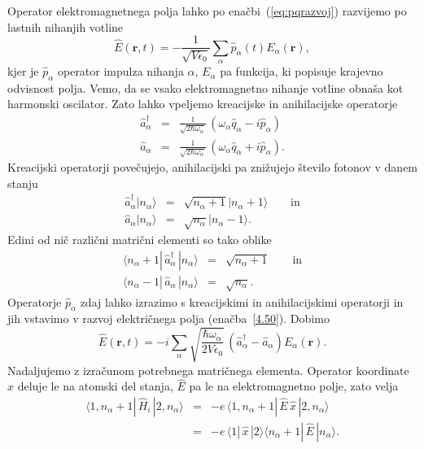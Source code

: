 \noindent
Operator elektromagnetnega polja lahko po enačbi~(\ref{eq:pqrazvoj}) 
razvijemo po lastnih nihanjih votline 
\begin{equation}
\hat{E}(\mathbf{r},t)=-\frac{1}{\sqrt{V\epsilon_{0}}}\sum_{\alpha}
\hat{p}_{\alpha}(t)E_{\alpha}(\mathbf{r}),
\label{4.50}
\end{equation}
kjer je $\hat{p}_{\alpha}$ operator impulza nihanja $\alpha$, $E_{\alpha}$
pa funkcija, ki popisuje krajevno odvisnost polja. Vemo, da se vsako 
elektromagnetno nihanje votline obnaša kot harmonski oscilator.
Zato lahko vpeljemo kreacijske in anihilacijske operatorje
\begin{eqnarray}
\hat{a}_{\alpha}^{\dagger} & = & \frac{1}{\sqrt{2\hbar\omega_{\alpha}}}\,
(\omega_{\alpha}\hat{q}_{\alpha}-i\hat{p}_{\alpha}) \\
\hat{a}_{\alpha} & = & \frac{1}{\sqrt{2\hbar\omega_{\alpha}}}\,(\omega_{\alpha}\hat{q}_{\alpha}+i\hat{p}_{\alpha}).
\end{eqnarray}
 Kreacijski operatorji povečujejo, anihilacijski pa znižujejo število
fotonov v danem stanju
\begin{eqnarray}
\hat{a}_{\alpha}^{\dagger}|n_{\alpha}\rangle & = & \sqrt{n_{\alpha}+1}
|n_{\alpha}+1\rangle\qquad \mathrm{in} \\
\hat{a}_{\alpha}|n_{\alpha}\rangle & = & \sqrt{n_{\alpha}}|n_{\alpha}-1\rangle.
\end{eqnarray}
Edini od nič različni matrični elementi so tako oblike
\begin{eqnarray}
\langle n_\alpha +1|\, \hat{a}_{\alpha}^{\dagger}\,|n_{\alpha}\rangle & = 
& \sqrt{n_{\alpha}+1} \qquad \mathrm{in} \nonumber\\
\langle n_\alpha-1|\,\hat{a}_{\alpha}\,|n_{\alpha}\rangle & = & \sqrt{n_{\alpha}}.
\label{eq:ankr}
\end{eqnarray}
Operatorje $\hat{p}_{\alpha}$ zdaj lahko izrazimo s kreacijskimi in anihilacijskimi
operatorji in jih vstavimo v razvoj električnega polja (enačba~\ref{4.50}). Dobimo
\begin{equation}
\hat{E}(\mathbf{r},t)=-i\sum_{\alpha}\sqrt{\frac{\hbar\omega_{\alpha}}{2V\epsilon_{0}}}\,
\left(\hat{a}_{\alpha}^{\dagger}-\hat{a}_{\alpha}\right)E_{\alpha}(\mathbf{r}).
\label{4.53}
\end{equation}
Nadaljujemo z izračunom potrebnega matričnega elementa. Operator koordinate
$\hat{x}$ deluje le na atomski del stanja, $\hat{E}$ pa le na elektromagnetno
polje, zato velja 
\begin{eqnarray}
\langle1,n_{\alpha}+1|\,\hat{H}_{i}\,|2,n_{\alpha}\rangle & = & -e\,
\langle1,n_{\alpha}+1|\,\hat{E}\,\hat{x}\,|2,n_{\alpha}\rangle \\
 & = & -e\,\langle1|\,\hat{x}\,|2\rangle\langle n_{\alpha}+1|\,\hat{E}\,|n_{\alpha}\rangle.
\end{eqnarray}

